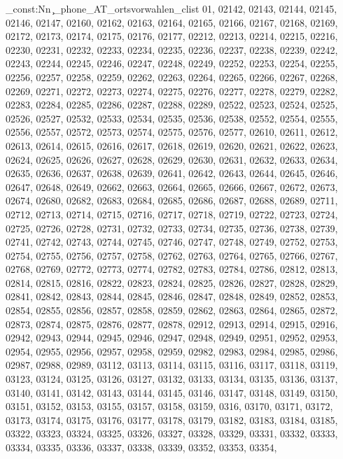 \clist_const:Nn \c_phone_AT_ortsvorwahlen_clist {01,
02142,
02143,
02144,
02145,
02146,
02147,
02160,
02162,
02163,
02164,
02165,
02166,
02167,
02168,
02169,
02172,
02173,
02174,
02175,
02176,
02177,
02212,
02213,
02214,
02215,
02216,
02230,
02231,
02232,
02233,
02234,
02235,
02236,
02237,
02238,
02239,
02242,
02243,
02244,
02245,
02246,
02247,
02248,
02249,
02252,
02253,
02254,
02255,
02256,
02257,
02258,
02259,
02262,
02263,
02264,
02265,
02266,
02267,
02268,
02269,
02271,
02272,
02273,
02274,
02275,
02276,
02277,
02278,
02279,
02282,
02283,
02284,
02285,
02286,
02287,
02288,
02289,
02522,
02523,
02524,
02525,
02526,
02527,
02532,
02533,
02534,
02535,
02536,
02538,
02552,
02554,
02555,
02556,
02557,
02572,
02573,
02574,
02575,
02576,
02577,
02610,
02611,
02612,
02613,
02614,
02615,
02616,
02617,
02618,
02619,
02620,
02621,
02622,
02623,
02624,
02625,
02626,
02627,
02628,
02629,
02630,
02631,
02632,
02633,
02634,
02635,
02636,
02637,
02638,
02639,
02641,
02642,
02643,
02644,
02645,
02646,
02647,
02648,
02649,
02662,
02663,
02664,
02665,
02666,
02667,
02672,
02673,
02674,
02680,
02682,
02683,
02684,
02685,
02686,
02687,
02688,
02689,
02711,
02712,
02713,
02714,
02715,
02716,
02717,
02718,
02719,
02722,
02723,
02724,
02725,
02726,
02728,
02731,
02732,
02733,
02734,
02735,
02736,
02738,
02739,
02741,
02742,
02743,
02744,
02745,
02746,
02747,
02748,
02749,
02752,
02753,
02754,
02755,
02756,
02757,
02758,
02762,
02763,
02764,
02765,
02766,
02767,
02768,
02769,
02772,
02773,
02774,
02782,
02783,
02784,
02786,
02812,
02813,
02814,
02815,
02816,
02822,
02823,
02824,
02825,
02826,
02827,
02828,
02829,
02841,
02842,
02843,
02844,
02845,
02846,
02847,
02848,
02849,
02852,
02853,
02854,
02855,
02856,
02857,
02858,
02859,
02862,
02863,
02864,
02865,
02872,
02873,
02874,
02875,
02876,
02877,
02878,
02912,
02913,
02914,
02915,
02916,
02942,
02943,
02944,
02945,
02946,
02947,
02948,
02949,
02951,
02952,
02953,
02954,
02955,
02956,
02957,
02958,
02959,
02982,
02983,
02984,
02985,
02986,
02987,
02988,
02989,
03112,
03113,
03114,
03115,
03116,
03117,
03118,
03119,
03123,
03124,
03125,
03126,
03127,
03132,
03133,
03134,
03135,
03136,
03137,
03140,
03141,
03142,
03143,
03144,
03145,
03146,
03147,
03148,
03149,
03150,
03151,
03152,
03153,
03155,
03157,
03158,
03159,
0316,
03170,
03171,
03172,
03173,
03174,
03175,
03176,
03177,
03178,
03179,
03182,
03183,
03184,
03185,
03322,
03323,
03324,
03325,
03326,
03327,
03328,
03329,
03331,
03332,
03333,
03334,
03335,
03336,
03337,
03338,
03339,
03352,
03353,
03354,
}
